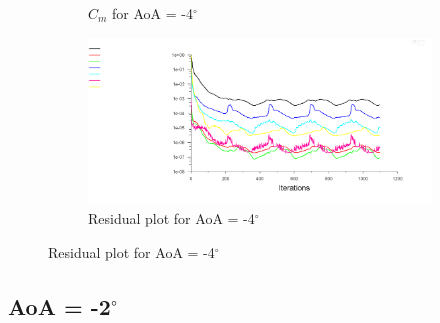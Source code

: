 \begin{figure}[H]
\begin{subfigure}[b]{0.5\textwidth}
    \caption{$C_m$ for AoA = -4$^\circ$}
    \label{fig:aoa_-4_cm}
  \end{subfigure}
  \begin{subfigure}[b]{0.5\textwidth}
    \includegraphics[width=\textwidth]{-4_deg/AoA_-4_resid.png}
    \caption{Residual plot for AoA = -4$^\circ$}
    \label{fig:aoa_-4_resid}
  \end{subfigure}
\end{figure}

\subsection*{AoA = -2$^\circ$}

